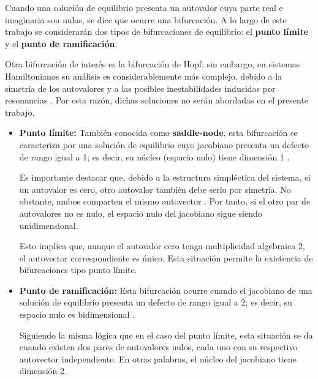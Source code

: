 Cuando una solución de equilibrio presenta un autovalor cuya parte real e imaginaria son nulas, se
dice que ocurre una bifurcación. A lo largo de este trabajo se considerarán dos tipos de bifurcaciones
de equilibrio: el \textbf{punto límite} y el \textbf{punto de ramificación}.

Otra bifurcación de interés es la bifurcación de Hopf; sin embargo, en sistemas Hamiltonianos su análisis es
considerablemente más complejo, debido a la simetría de los autovalores y a las posibles inestabilidades inducidas
por resonancias . Por esta razón, dichas soluciones no serán abordadas  en el presente trabajo.

\begin{itemize}
    \item \textbf{Punto límite: }También conocida como \textbf{saddle-node}, esta bifurcación se caracteriza por una solución de
          equilibrio cuyo jacobiano presenta un defecto de rango igual a 1; es decir, su núcleo (espacio nulo)
          tiene dimensión 1 \cite{govaertsbifurcations}.

          Es importante destacar que, debido a la estructura simpléctica del sistema, si un autovalor
          es cero, otro autovalor también debe serlo por simetría. No obstante, ambos comparten el mismo
          autovector \cite{meyer1992introduction}. Por tanto, si el otro par de autovalores no es nulo, el espacio nulo del jacobiano
          sigue siendo unidimensional.

          Esto implica que, aunque el autovalor cero tenga multiplicidad algebraica 2, el autovector correspondiente
          es único. Esta situación permite la existencia de bifurcaciones tipo punto límite.

    \item \textbf{Punto de ramificación: }Esta bifurcación ocurre cuando el jacobiano de una solución de equilibrio presenta un defecto de
          rango igual a 2; es decir, su espacio nulo es bidimensional \cite{govaertsbifurcations}.

          Siguiendo la misma lógica que en el caso del punto límite, esta situación se da cuando existen dos
          pares de autovalores nulos, cada uno con su respectivo autovector independiente. En otras palabras,
          el núcleo del jacobiano tiene dimensión 2.

\end{itemize}



